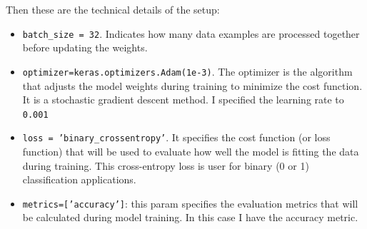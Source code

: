 Then these are the technical details of the setup:
\begin{itemize}
\item \texttt{batch\_size =  32}. Indicates how many data examples are processed together before updating the weights.
\item \texttt{optimizer=keras.optimizers.Adam(1e-3)}. The optimizer is the algorithm that adjusts the model weights during training to minimize the cost function. It is a stochastic gradient descent method. I specified the learning rate to \texttt{0.001}
\item \texttt{loss = 'binary\_crossentropy'}. It specifies the cost function (or loss function) that will be used to evaluate how well the model is fitting the data during training. This cross-entropy loss is user for binary (0 or 1) classification applications.
\item \texttt{metrics=['accuracy']}: this param specifies the evaluation metrics that will be calculated during model training. In this case I have the accuracy metric.
\end{itemize}